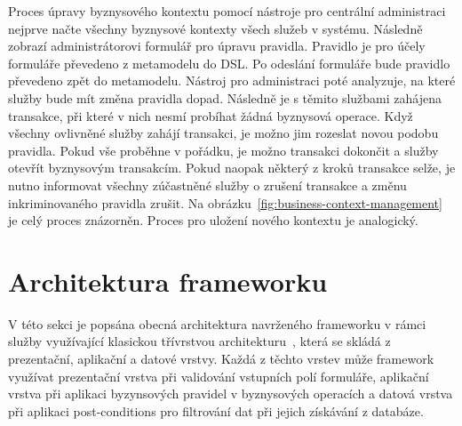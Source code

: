 Proces úpravy byznysového kontextu pomocí nástroje pro centrální administraci nejprve načte všechny
byznysové kontexty všech služeb v systému. Následně zobrazí administrátorovi formulář pro úpravu pravidla.
Pravidlo je pro účely formuláře převedeno z metamodelu do \gls{DSL}. Po odeslání formuláře bude pravidlo
převedeno zpět do metamodelu. Nástroj pro administraci poté analyzuje, na které služby bude
mít změna pravidla dopad. Následně je s těmito službami zahájena transakce, při které v nich
nesmí probíhat žádná byznysová operace. Když všechny ovlivněné služby zahájí transakci, je možno
jim rozeslat novou podobu pravidla. Pokud vše proběhne v pořádku, je možno transakci dokončit
a služby otevřít byznysovým transakcím. Pokud naopak některý z kroků transakce selže, je nutno
informovat všechny zúčastněné služby o zrušení transakce a změnu inkriminovaného pravidla zrušit.
Na obrázku~\ref{fig:business-context-management} je celý proces znázorněn. Proces pro uložení
nového kontextu je analogický.

\section{Architektura frameworku}\label{sec:architecture}

V této sekci je popsána obecná architektura navrženého frameworku v rámci služby využívající
klasickou třívrstvou architekturu~\cite{fowler2002patterns}, která se skládá z prezentační,
aplikační a datové vrstvy. Každá z těchto vrstev může framework využívat
\textendash\xspace prezentační vrstva při validování vstupních polí formuláře, aplikační vrstva při
aplikaci byzynsových pravidel v byznysových operacích a datová vrstva při aplikaci post-conditions pro
filtrování dat při jejich získávání z databáze.

